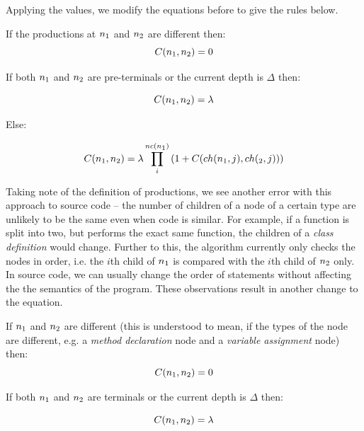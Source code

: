 Applying the values, we modify the equations before to give the rules below.

If the productions at $n\textsubscript{1}$ and $n\textsubscript{2}$ are different
then:
\begin{equation}
C(n\textsubscript{1}, n\textsubscript{2}) = 0
\end{equation}

If both $n\textsubscript{1}$ and $n\textsubscript{2}$ are pre-terminals or the
current depth is $\Delta$ then:

\begin{equation}
C(n\textsubscript{1}, n\textsubscript{2}) = \lambda
\end{equation}

Else:

\begin{equation}
C(n\textsubscript{1}, n\textsubscript{2}) = \lambda\prod_{i}^{nc(n\textsubscript{1})}
{(1+C(ch(n\textsubscript{1}, j), ch(\textsubscript{2}, j)))}
\end{equation}
\cite{ParseTreeKernel}

Taking note of the definition of productions, we see another error with this
approach to source code -- the number of children of a node of a certain type
are unlikely to be the same even when code is similar. For example, if a function
is split into two, but performs the exact same function, the children of a
\emph{class definition} would change. Further to this, the algorithm currently
only checks the nodes in order, i.e. the $i$th child of $n\textsubscript{1}$ is
compared with the $i$th child of $n\textsubscript{2}$ only. In source code, we
can usually change the order of statements without affecting the the semantics
of the program. These observations result in another change to the equation.

If $n\textsubscript{1}$ and $n\textsubscript{2}$ are different (this is understood
to mean, if the types of the node are different, e.g. a \emph{method declaration}
node and a \emph{variable assignment} node)
then:
\begin{equation}\label{eq:parseTreeKernelBase1}
C(n\textsubscript{1}, n\textsubscript{2}) = 0
\end{equation}

If both $n\textsubscript{1}$ and $n\textsubscript{2}$ are terminals or the
current depth is $\Delta$ then:

\begin{equation}\label{eq:parseTreeKernelBase2}
C(n\textsubscript{1}, n\textsubscript{2}) = \lambda
\end{equation}

